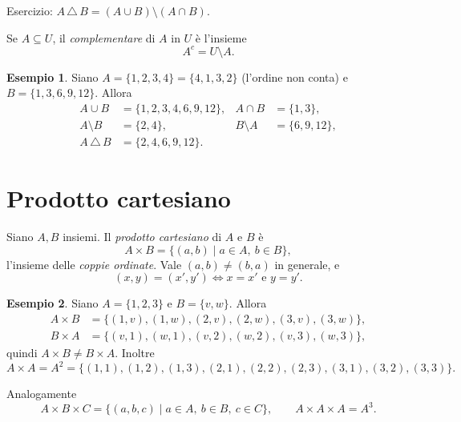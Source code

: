 \documentclass[11pt,a4paper]{article}
\theoremstyle{definition}
\newtheorem*{esempio}{Esempio}
\begin{document}
Esercizio: $A \,\triangle\, B = (A \cup B) \setminus (A \cap B)$.

\begin{definizione}
Se $A \subseteq U$, il \emph{complementare} di $A$ in $U$ è l'insieme
\[
A^c = U \setminus A.
\]
\end{definizione}

\begin{esempio}
Siano $A = \{1, 2, 3, 4\} = \{4, 1, 3, 2\}$ (l'ordine non conta) e
$B = \{1, 3, 6, 9, 12\}$. Allora
\begin{align*}
A \cup B &= \{1, 2, 3, 4, 6, 9, 12\}, & A \cap B &= \{1, 3\}, \\
A \setminus B &= \{2, 4\}, & B \setminus A &= \{6, 9, 12\}, \\
A \,\triangle\, B &= \{2, 4, 6, 9, 12\}.
\end{align*}
\end{esempio}

\section{Prodotto cartesiano}

\begin{definizione}
Siano $A, B$ insiemi. Il \emph{prodotto cartesiano} di $A$ e $B$ è
\[
A \times B = \{(a, b) \mid a \in A,\ b \in B\},
\]
l'insieme delle \emph{coppie ordinate}. Vale $(a, b) \neq (b, a)$ in
generale, e
\[
(x, y) = (x', y') \iff x = x' \text{ e } y = y'.
\]
\end{definizione}

\begin{esempio}
Siano $A = \{1, 2, 3\}$ e $B = \{v, w\}$. Allora
\begin{align*}
A \times B &= \{(1,v), (1,w), (2,v), (2,w), (3,v), (3,w)\}, \\
B \times A &= \{(v,1), (w,1), (v,2), (w,2), (v,3), (w,3)\},
\end{align*}
quindi $A \times B \neq B \times A$. Inoltre
\[
A \times A = A^2 = \{(1,1), (1,2), (1,3), (2,1), (2,2), (2,3), (3,1),
(3,2), (3,3)\}.
\]
\end{esempio}

Analogamente
\[
A \times B \times C = \{(a, b, c) \mid a \in A,\ b \in B,\ c \in C\},
\qquad A \times A \times A = A^3.
\]
\end{document}
